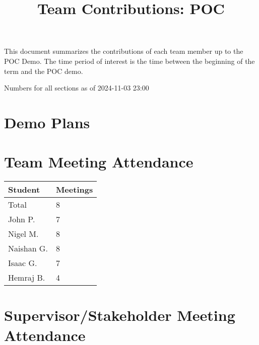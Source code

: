 \documentclass{article}
\title{Team Contributions: POC\\\progname}
\author{\authname}
\date{}
\begin{document}
\maketitle

This document summarizes the contributions of each team member up to the POC
Demo.  The time period of interest is the time between the beginning of the term
and the POC demo.

Numbers for all sections as of 2024-11-03 23:00

\section{Demo Plans}


\section{Team Meeting Attendance}


\begin{table}[H]
\centering
\begin{tabular}{ll}
\toprule
\textbf{Student} & \textbf{Meetings}\\
\midrule
Total & 8\\
John P. & 7\\
Nigel M. & 8\\
Naishan G. & 8\\
Isaac G. & 7\\
Hemraj B. & 4\\
\bottomrule
\end{tabular}
\end{table}


\section{Supervisor/Stakeholder Meeting Attendance}

\end{document}
